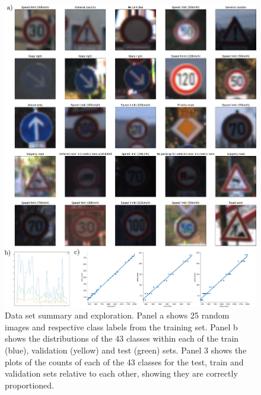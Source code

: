 \documentclass[letterpaper,12pt]{article}
\begin{document}
\begin{figure}
\centering
\includegraphics[scale=0.4]{results/fig1.pdf}
\caption{Data set summary and exploration. Panel a shows 25 random images and respective class labels from the training set. Panel b shows the distributions of the 43 classes within each of the train (blue), validation (yellow) and test (green) sets. Panel 3 shows the plots of the counts of each of the 43 classes for the test, train and validation sets relative to each other, showing they are correctly proportioned.}
\end{figure}
\newpage
\end{document}

